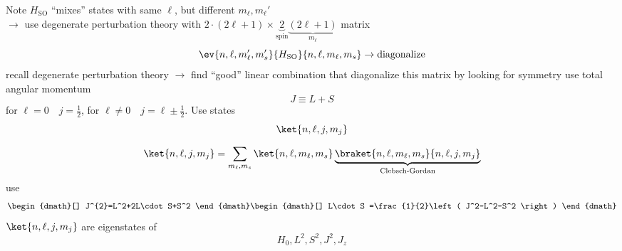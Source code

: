 Note 
$H_{\text{SO}}$ ``mixes'' states with same $\ell$, but different $m_{\ell},m_{\ell}'$\\
$\to$ use degenerate perturbation theory with $2\cdot \left( 2\ell +1 \right)\times \underbrace{2}_{\text{spin}}\underbrace{\left( 2\ell +1 \right)}_{ m_{\ell}}$ matrix
\begin{dmath}[]
	\ev{n,\ell,m_{\ell}',m_s'}{H_{\text{SO}}}{n,\ell,m_{\ell},m_{s}}\to \text{diagonalize}
\end{dmath}
recall degenerate perturbation theory $\to$ find  ``good'' linear combination that diagonalize this matrix by looking for symmetry use total angular momentum
\begin{dmath}[]
	J\equiv L+S
\end{dmath}
for $\ell=0\quad j=\frac{1}{2}$, for $\ell\neq 0\quad j=\ell\pm \frac{1}{2}$. Use states
\begin{dmath}[]
	\ket{n,\ell,j,m_{j}}
\end{dmath}
\begin{dmath}[]
	\ket{n,\ell,j,m_{j}}=\sum_{m_{\ell},m_{s}}^{}\ket{n,\ell,m_{\ell},m_{s}}\underbrace{\braket{n,\ell,m_{\ell},m_{s}}{n,\ell,j,m_{j}}}_{\text{Clebsch-Gordan}}
\end{dmath}
use 
\begin{dgroup}[]
	\begin{dmath}[]
		J^{2}=L^2+2L\cdot S+S^2
	\end{dmath}
	\begin{dmath}[]
		L\cdot S =\frac{1}{2}\left( J^2-L^2-S^2 \right)
	\end{dmath}
\end{dgroup}
$\ket{n,\ell,j,m_{j}}$ are eigenstates of 
\begin{dmath}[]
	H_0,L^2,S^2,J^2,J_z
\end{dmath}
